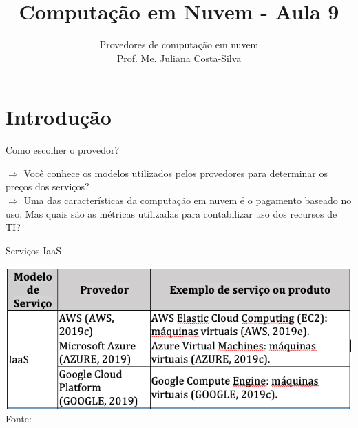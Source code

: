 \documentclass{beamer}
\title{Computação em Nuvem - Aula 9}
\subtitle{Provedores de computação em nuvem \\
Prof. Me. Juliana Costa-Silva}
\begin{document}
\frame{
 \titlepage
}


\section{Introdução}
\begin{frame}{Como escolher o provedor?}
    
   $ \Rightarrow$ Você conhece os modelos utilizados pelos provedores para determinar os preços dos serviços? \\
   \vspace{0.5cm}
   $\Rightarrow$ Uma das características da computação em nuvem é o pagamento baseado no uso. Mas quais são as métricas utilizadas para contabilizar uso dos recursos de TI?
    
\end{frame}
\begin{frame}{Serviços IaaS}

\begin{center}
	\includegraphics[height=0.47\paperheight]{fig/aula9/IaaS.png} \\
	Fonte: \cite{malheiros2019cc}
      \end{center}
    
\end{frame}
\end{document}
